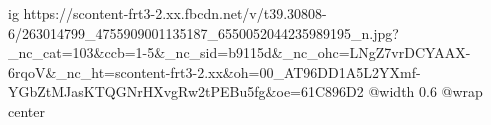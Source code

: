 
 
 
 
 

\ifcmt
  ig https://scontent-frt3-2.xx.fbcdn.net/v/t39.30808-6/263014799_4755909001135187_6550052044235989195_n.jpg?_nc_cat=103&ccb=1-5&_nc_sid=b9115d&_nc_ohc=LNgZ7vrDCYAAX-6rqoV&_nc_ht=scontent-frt3-2.xx&oh=00_AT96DD1A5L2YXmf-YGbZtMJasKTQGNrHXvgRw2tPEBu5fg&oe=61C896D2
  @width 0.6
	@wrap center
\fi

\begin{center}
\end{center}
